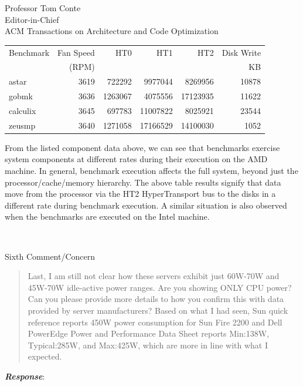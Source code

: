 \documentclass[10pt]{letter} %
\newenvironment{rviewcomment}
{~\\%
\begin{bfseries}}
{\end{bfseries}}
\newcommand{\rviewresponse}{\textbf{\textit{Response}}:}
\begin{document}
\begin{letter}{Professor Tom Conte \\
Editor-in-Chief \\
ACM Transactions on Architecture and Code Optimization }
\begin{tabular}{lrrrrr}
\hline
Benchmark & Fan Speed & HT0 & HT1 & HT2 & Disk Write \\
 & (RPM) &  &  &  & KB \\
\hline
astar & 3619 & 722292 & 9977044 & 8269956 & 10878 \\
gobmk & 3636 & 1263067 & 4075556 & 17123935 & 11622 \\
calculix & 3645 & 697783 & 11007822 & 8025921 & 23544 \\
zeusmp & 3640 & 1271058 & 17166529 & 14100030 & 1052 \\
\hline
\end{tabular}

From the listed component data above, we can see that benchmarks
exercise system components at different rates during their execution on
the AMD machine.  In general, benchmark execution affects the full
system, beyond just the processor/cache/memory hierarchy.  The above
table results signify that data move from the processor via the HT2
HyperTransport bus to the disks in a different rate during benchmark
execution.  A similar situation is also observed when the benchmarks are
executed on the Intel machine.

\begin{rviewcomment}
  Sixth Comment/Concern
\end{rviewcomment}
\begin{quote}
  \begin{itshape}
    Last, I am still not clear how these servers exhibit just 60W-70W
    and 45W-70W idle-active power ranges. Are you showing ONLY CPU
    power? Can you please provide more details to how you confirm this
    with data provided by server manufacturers?  Based on what I had
    seen, Sun quick reference reports 450W power consumption for Sun
    Fire 2200 and Dell PowerEdge Power and Performance Data Sheet
    reports Min:138W, Typical:285W, and Max:425W, which are more in line
    with what I expected.
  \end{itshape}
\end{quote}
\rviewresponse


\end{letter}
\end{document}
